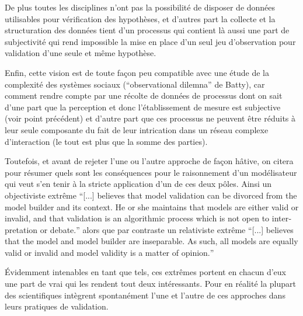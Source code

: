 De plus toutes les disciplines n'ont pas la possibilité de disposer de données utilisables pour vérification des hypothèses, et d'autres part la collecte et la structuration des données tient d'un processus qui contient là aussi une part de subjectivité qui rend impossible la mise en place d'un seul jeu d'observation pour validation d'une seule et même hypothèse.

Enfin, cette vision est de toute façon peu compatible avec une étude de la complexité des systèmes sociaux (\enquote{observational dilemna} de Batty), car comment rendre compte par une récolte de données de processus dont on sait d'une part que la perception et donc l'établissement de mesure est subjective (voir point précédent) et d'autre part que ces processus ne peuvent être réduits à leur seule composante du fait de leur intrication dans un réseau complexe d'interaction (le tout est plus que la somme des parties).



Toutefois, et avant de rejeter l'une ou l'autre approche de façon hâtive, on citera \textcite{Kleindorfer1998} pour résumer quels sont les conséquences pour le raisonnement d'un modélisateur qui veut s'en tenir à la stricte application d'un de ces deux pôles. Ainsi un objectiviste extrême \foreignquote{english}{[...] believes that model validation can be divorced from the model builder and its context. He or she maintains that models are either valid or invalid, and that validation is an algorithmic process which is not open to interpretation or debate.} alors que par contraste un relativiste extrême \foreignquote{english}{[...] believes that the model and model builder are inseparable. As such, all models are equally valid or invalid and model validity is a matter of opinion.}

Évidemment intenables en tant que tels, ces extrêmes portent en chacun d'eux une part de vrai qui les rendent tout deux intéressants. Pour \textcite{Kleindorfer1998} en réalité la plupart des scientifiques intègrent spontanément l'une et l'autre de ces approches dans leurs pratiques de validation.

